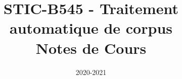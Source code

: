 
\graphicspath{{images/}}

\title{STIC-B545 - Traitement automatique de corpus \\ Notes de Cours}
\date{2020-2021}


\maketitle
\tableofcontents
\newpage


\newpage

\newpage


